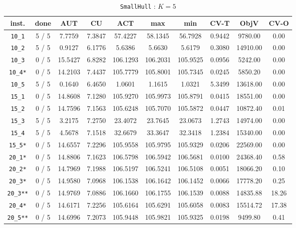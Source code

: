 \begin{table}[h!]
\begin{center}
\small
\begin{tabular}{| c | c | c | c | c | c | c | c | c | c |}
\hline
inst. & done & AUT & CU & ACT & max & min & CV-T & ObjV & CV-O \\
\hline
\verb|10_1| & 5 / 5 & 7.7759 & 7.3847 & 57.4227 & 58.1345 & 56.7928 & 0.9442 & 9780.00 & 0.00\\ 
\verb|10_2| & 5 / 5 & 0.9127 & 6.1776 & 5.6386 & 5.6630 & 5.6179 & 0.3080 & 14910.00 & 0.00\\ 
\verb|10_3| & 0 / 5 & 15.5427 & 6.8282 & 106.1293 & 106.2031 & 105.9525 & 0.0956 & 5242.00 & 0.00\\ 
\verb|10_4*| & 0 / 5 & 14.2103 & 7.4437 & 105.7779 & 105.8001 & 105.7345 & 0.0245 & 5850.20 & 0.00\\ 
\verb|10_5| & 5 / 5 & 0.1640 & 6.4650 & 1.0601 & 1.1615 & 1.0321 & 5.3499 & 13618.00 & 0.00\\ 
\verb|15_1| & 0 / 5 & 14.8608 & 7.1280 & 105.9270 & 105.9973 & 105.8791 & 0.0415 & 18551.00 & 0.00\\ 
\verb|15_2| & 0 / 5 & 14.7596 & 7.1563 & 105.6248 & 105.7070 & 105.5872 & 0.0447 & 10872.40 & 0.01\\ 
\verb|15_3| & 5 / 5 & 3.2175 & 7.2750 & 23.4072 & 23.7645 & 23.0673 & 1.2743 & 14974.00 & 0.00\\ 
\verb|15_4| & 5 / 5 & 4.5678 & 7.1518 & 32.6679 & 33.3647 & 32.3418 & 1.2384 & 15340.00 & 0.00\\ 
\verb|15_5*| & 0 / 5 & 14.6557 & 7.2296 & 105.9558 & 105.9795 & 105.9329 & 0.0206 & 22569.00 & 0.00\\ 
\verb|20_1*| & 0 / 5 & 14.8806 & 7.1623 & 106.5798 & 106.5942 & 106.5681 & 0.0100 & 24368.40 & 0.58\\ 
\verb|20_2*| & 0 / 5 & 14.7969 & 7.1988 & 106.5197 & 106.5241 & 106.5108 & 0.0051 & 18066.20 & 0.10\\ 
\verb|20_3*| & 0 / 5 & 14.9580 & 7.0968 & 106.1538 & 106.1642 & 106.1452 & 0.0066 & 17778.20 & 0.25\\ 
\verb|20_3**| & 0 / 5 & 14.9769 & 7.0886 & 106.1660 & 106.1755 & 106.1539 & 0.0088 & 14835.88 & 18.26\\ 
\verb|20_4*| & 0 / 5 & 14.6171 & 7.2256 & 105.6164 & 105.6291 & 105.6058 & 0.0083 & 15514.72 & 17.38\\ 
\verb|20_5**| & 0 / 5 & 14.6996 & 7.2073 & 105.9448 & 105.9821 & 105.9325 & 0.0198 & 9499.80 & 0.41\\ 
\hline
\end{tabular}
\caption{\texttt{SmallHull} : $K=5$}
\label{table:hull:5}
\end{center}
\end{table}

